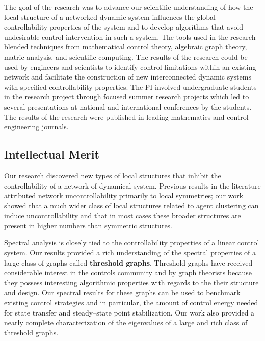 \documentclass[11pt]{article}
\begin{document}
The goal of the research was to advance our scientific understanding of how the local structure of a networked dynamic system influences the global controllability properties of the system and to develop algorithms that avoid undesirable control intervention in such a system. The tools used in the research blended techniques from mathematical control theory, algebraic graph theory, matric analysis, and scientific computing. The results of the research could be used by engineers and scientists to identify control limitations within an existing network and facilitate the construction of new interconnected dynamic systems with specified controllability properties. The PI involved undergraduate students in the research project through focused summer research projects which led to several presentations at national and international conferences by the students.  The results of the research were published in leading mathematics and control engineering journals.

\subsection{Intellectual Merit}
Our research discovered new types of local structures that inhibit the controllability of a network of dynamical system. Previous results in the literature attributed network uncontrollability primarily to local symmetries; our work showed that a much wider class of local structures related to agent clustering can induce uncontrollability and that in most cases these broader structures are present in higher numbers than symmetric structures.

Spectral analysis is closely tied to the controllability properties of a linear control system. Our results provided a rich understanding of the spectral properties of a large class of graphs called \textbf{threshold graphs}. Threshold graphs have received considerable interest in the controls community and by graph theorists because they possess interesting algorithmic properties with regards to the their structure and design. Our spectral results for these graphs can be used to benchmark existing control strategies and in particular, the amount of control energy needed for state transfer and steady--state point stabilization.  Our work also provided a nearly complete characterization of the eigenvalues of a large and rich class of threshold graphs.
\end{document}
